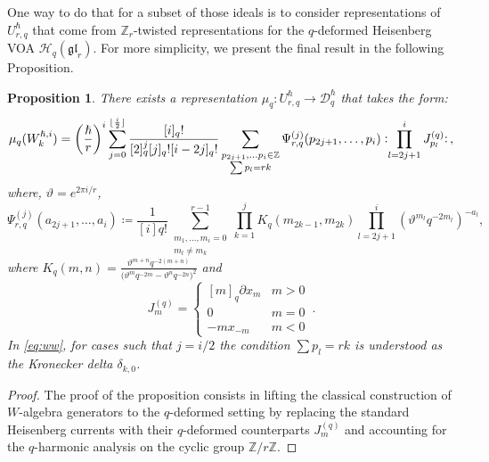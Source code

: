 \documentclass[reqno,11pt]{amsart}
\theoremstyle{plain}
\newtheorem{proposition}[theorem]{Proposition}
\theoremstyle{definition}
\theoremstyle{remark}
\numberwithin{equation}{section}
\renewcommand{\theta}{\vartheta}
\newcommand{\normord}[1]{\vcentcolon\mathrel{#1}\vcentcolon}
\newcommand{\mb}[1]{\mathbb{#1}}
\newcommand{\1}{\mathds{1}}
\newcommand{\Z}{\mb{Z}}
\newcommand{\2}{\frac{1}{2}}
\begin{document}
{				
				{One way to do that for a subset of those ideals is to consider representations of $U_{r,q}^\hslash$ that come from $\mathbb{Z}_r$-twisted representations for the $q$-deformed Heisenberg VOA $\mathcal{H}_q(\mathfrak{gl}_r)$. 
					For more simplicity, we present the final result in the following  Proposition.}
				
				\begin{proposition}
					There exists a representation $\mu_q: U^\hslash_{r,q} \to \mathcal{D}_{q}^\hslash$ that takes the form:
					\begin{equation}\label{eq:ww}
						\mu_q( W^{\hslash,i}_k)
						=
						\left(\frac{\hslash}{r} \right)^i \sum_{j=0}^{\lfloor \frac{i}{2} \rfloor} \frac{[i]_q!}{[2]_q^j [j]_q! [i-2j]_q!} \sum_{\substack{p_{2j+1}, \dotsc p_i \in \Z \\ \sum p_l = rk}} \Psi^{(j)}_{r,q} (p_{2j+1}, \dotsc, p_i) \normord{ \prod_{l=2j+1}^i J^{(q)}_{p_l}} \,,
					\end{equation}
					where,  $ \theta = e^{2 \pi i /r}$,
					\begin{equation}
						\Psi^{(j)}_{r,q} (a_{2j+1}, \dotsc, a_i) \coloneqq \frac{1}{[i]q!} \sum_{\substack{m_1, \dotsc, m_i = 0\\ m_l \neq m_k}}^{r-1} \prod_{k = 1}^j {K}_q(m_{2k-1}, m_{2k}) \prod_{l=2j+1}^i (\theta^{m_l} q^{-2m_l})^{-a_l},
					\end{equation} where ${K}_q(m, n)=\frac{\theta^{m+n}q^{-2(m+n)}}{\big(\theta^{m}q^{-2m}-\theta^{n}q^{-2n}\big)^2}$
					and
					\begin{equation}\label{eq:Js}
						J^{(q)}_m  = \begin{cases} [m]_q \partial{x_m} & m > 0 \\ 0 & m =0 \\ -m x_{-m} & m < 0\end{cases} \,.
					\end{equation}
					In \eqref{eq:ww}, for cases such that $j=i/2$ the condition $\sum p_l = rk$ is understood as the Kronecker delta $\delta_{k,0}$.
				\end{proposition}
				
				\begin{proof}
					{The proof of the proposition consists in lifting the classical construction of $W$-algebra generators to the $q$-deformed setting by replacing the standard Heisenberg currents with their $q$-deformed counterparts $J^{(q)}_m$ and accounting for the $q$-harmonic analysis on the cyclic group $\mathbb{Z}/r\mathbb{Z}$.}
					

\end{proof}}
\end{document}
